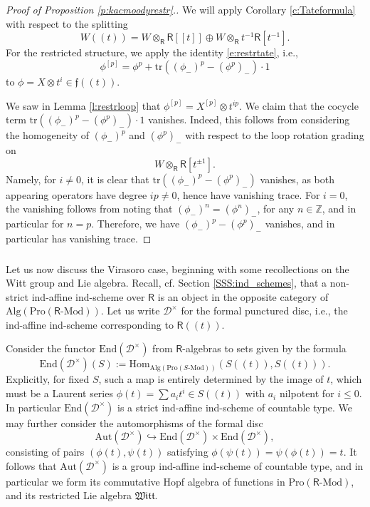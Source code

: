 \documentclass{amsart}
\theoremstyle{definition}
\newcommand{\Pro}{\on{Pro}}
\newcommand{\sss}{\subsubsection{}}
\newcommand{\D}{\sD}
\newcommand{\sD}{\mathscr{D}}
\newcommand{\Hom}{\on{Hom}}
\renewcommand{\mod}{\text{-}\on{Mod}}
\newcommand{\on}{\mathrm}
\newcommand{\Ring}{\mathsf{R}}
\newcommand{\ff}{\mathfrak{f}}
\numberwithin{equation}{section}
\begin{document}

\begin{proof}[Proof of Proposition \ref{p:kacmoodyrestr}.] We will apply Corollary \ref{c:Tateformula} with respect to the splitting $$W(\!(t)\!) = W \otimes_{\Ring} \Ring[[t]] \oplus W \otimes_{\Ring} t^{-1} \Ring[t^{-1}].$$ For the restricted structure, we apply the identity
 \eqref{e:restrtate}, i.e., 
 $$\phi^{[p]} = \phi^p  + \on{tr}( (\phi_-)^p - (\phi^p)_-) \cdot 1$$
 to $\phi = X \otimes t^i \in \ff(\!(t)\!)$. 
 
 
 We saw in Lemma \ref{l:restrloop} that $\phi^{[p]} = X^{[p]} \otimes t^{ip}$.  We claim that the cocycle term $ \on{tr}( (\phi_-)^p - (\phi^p)_-) \cdot 1$ vanishes. Indeed, this follows from considering the homogeneity of $(\phi_-)^p$ and $(\phi^p)_-$ with respect to the loop rotation grading on $$W \otimes_{\Ring} \Ring[t^{\pm 1}].$$Namely, for $i \neq 0$, it is clear that $\on{tr}( (\phi_-)^p - (\phi^p)_-)$ vanishes, as both appearing operators have degree $ip \neq 0$, hence have vanishing trace. For $i = 0$,  the vanishing follows from noting that $(\phi_-)^n = (\phi^n)_-$, for any $n \in \mathbb{Z}$, and in particular for $n = p$. Therefore, we have $(\phi_-)^p - (\phi^p)_-$ vanishes, and in particular has vanishing trace.    
\end{proof}



\sss\label{SSS_Virasoro}
Let us now discuss the Virasoro case, beginning with some recollections on the Witt group and Lie algebra. Recall, cf. {Section \ref{SSS:ind_schemes}}, that a non-strict ind-affine ind-scheme over $\Ring$ is an object in the opposite category of $\on{Alg}(\Pro(\Ring\mod))$. Let us write $\D^{\times}$ for the formal punctured disc, i.e., the ind-affine ind-scheme corresponding to $\Ring(\!(t)\!).$


Consider the functor $\on{End}(\D^\times)$ from $\Ring$-algebras to sets given by the formula 
$$\on{End}(\D^\times)(S) := \Hom_{\on{Alg}(\Pro(S\mod))}(S(\!(t)\!), S(\!(t)\!)).$$Explicitly, for fixed $S$, such a map is entirely determined by the image of $t$, which must be a Laurent series $\phi(t) = \sum a_i t^i  \in S(\!(t)\!)$ with $a_i$ nilpotent for $i \leqslant 0$. In particular $\on{End}(\D^\times)$ is a strict ind-affine ind-scheme of countable type. We may further consider the automorphisms of the formal disc
$$\on{Aut}(\D^\times) \hookrightarrow \on{End}(\D^\times) \times \on{End}(\D^\times),$$
consisting of pairs $(\phi(t), \psi(t))$ satisfying $\phi(\psi(t)) = \psi(\phi(t)) = t.$ It follows that $\on{Aut}(\D^\times)$ is a group ind-affine ind-scheme of countable type, and in particular we form its commutative Hopf algebra of functions in $\Pro(\Ring\mod)$, and its restricted Lie algebra $\mathfrak{Witt}$. 
\end{document}
